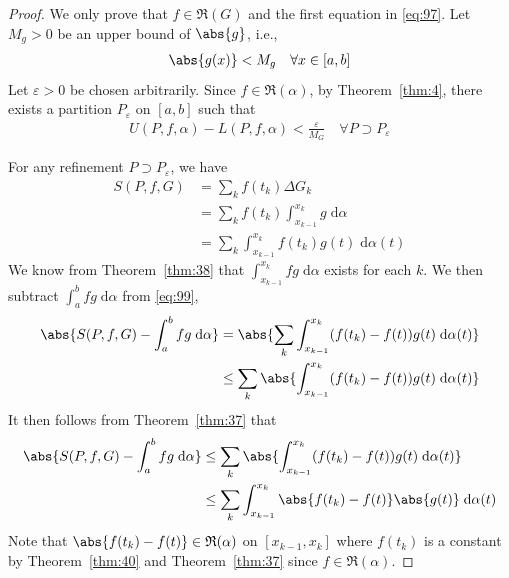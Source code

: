 \documentclass[thmcnt=section, 12pt]{elegantbook}
\begin{document}
\begin{proof}
    We only prove that $f \in \mathfrak{R}(G)$ and the first equation in \eqref{eq:97}. Let $M_g > 0$ be an upper bound of $\abs{g}$, i.e., 
    \begin{align*}
        \abs{g(x)} < M_g
        \quad \forall x \in [a, b]
    \end{align*} 
    Let $\varepsilon > 0$ be chosen arbitrarily. Since $f \in \mathfrak{R}(\alpha)$, by Theorem~\ref{thm:4}, there exists a partition $P_\varepsilon$ on $[a, b]$ such that 
    \begin{align}
        U(P, f, \alpha) - L(P, f, \alpha) < \frac{\varepsilon}{M_G}
        \quad \forall P \supset P_\varepsilon
        \label{eq:98}
    \end{align}

    \par For any refinement $P \supset P_\varepsilon$, we have 
    \begin{align}
        S(P, f, G)
        &= \sum_k f(t_k) \Delta G_k \nonumber \\ 
        &= \sum_k f(t_k) \int_{x_{k-1}}^{x_k} g \; \mathrm{d}\alpha \nonumber \\ 
        &= \sum_k  \int_{x_{k-1}}^{x_k} f(t_k) g(t) \; \mathrm{d}\alpha(t)
        \label{eq:99}
    \end{align}
    We know from Theorem~\ref{thm:38} that $\int_{x_{k-1}}^{x_k} fg \; \mathrm{d}\alpha$ exists for each $k$. We then subtract $\int_a^b fg \; \mathrm{d}\alpha$ from \eqref{eq:99},
    \begin{align*}
        \abs{
            S(P, f, G)
            - \int_a^b fg \; \mathrm{d}\alpha
        } &= \abs{
            \sum_k \int_{x_{k-1}}^{x_k} (f(t_k) - f(t)) g(t) \; \mathrm{d}\alpha(t)
        } \\ 
        &\leq \sum_k \abs{
            \int_{x_{k-1}}^{x_k} (f(t_k) - f(t)) g(t) \; \mathrm{d}\alpha(t)
        }
    \end{align*}
    It then follows from Theorem~\ref{thm:37} that 
    \begin{align}
        \abs{
            S(P, f, G)
            - \int_a^b fg \; \mathrm{d}\alpha
        }  
        &\leq \sum_k \abs{
            \int_{x_{k-1}}^{x_k} (f(t_k) - f(t)) g(t) \; \mathrm{d}\alpha(t)
        } \nonumber \\ 
        &\leq \sum_k \int_{x_{k-1}}^{x_k} \abs{f(t_k) - f(t)} \abs{g(t)} \; \mathrm{d}\alpha(t)
        \label{eq:100}
    \end{align}
    Note that $\abs{f(t_k) - f(t)} \in \mathfrak{R}(\alpha)$ on $[x_{k-1}, x_k]$ where $f(t_k)$ is a constant by Theorem~\ref{thm:40} and Theorem~\ref{thm:37} since $f \in \mathfrak{R}(\alpha)$.


\end{proof}
\end{document}
